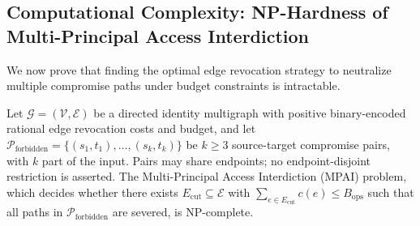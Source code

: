 \subsection{Computational Complexity: NP-Hardness of Multi-Principal Access Interdiction}
We now prove that finding the optimal edge revocation strategy to neutralize multiple compromise paths under budget constraints is intractable.

\begin{theorem}
\label{thm:nphardness}
Let $\mathcal{G} = (\mathcal{V}, \mathcal{E})$ be a directed identity multigraph with positive binary-encoded rational edge revocation costs and budget, and let $\mathcal{P}_{\text{forbidden}} = \{(s_1, t_1), \dots, (s_k, t_k)\}$ be $k \ge 3$ source-target compromise pairs, with $k$ part of the input. Pairs may share endpoints; no endpoint-disjoint restriction is asserted. The Multi-Principal Access Interdiction (MPAI) problem, which decides whether there exists $E_{\text{cut}} \subseteq \mathcal{E}$ with $\sum_{e \in E_{\text{cut}}} c(e) \le B_{\text{ops}}$ such that all paths in $\mathcal{P}_{\text{forbidden}}$ are severed, is NP-complete.
\end{theorem}

